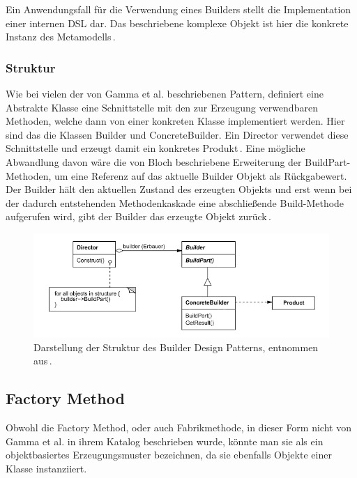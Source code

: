 \documentclass[12pt,oneside,a4paper,parskip]{scrbook}
\begin{document}
Ein Anwendungsfall für die Verwendung eines Builders stellt die Implementation einer internen DSL dar. Das beschriebene komplexe Objekt ist hier die konkrete Instanz des Metamodells\,\cite[S. 343ff.]{fowler2010}.

\subsubsection{Struktur}

Wie bei vielen der von Gamma et al. beschriebenen Pattern, definiert eine Abstrakte Klasse eine Schnittstelle mit den zur Erzeugung verwendbaren Methoden, welche dann von einer konkreten Klasse implementiert werden. Hier sind das die Klassen Builder und ConcreteBuilder. Ein Director verwendet diese Schnittstelle und erzeugt damit ein konkretes Produkt\,\cite[S. 162f.]{gamma2015}. Eine mögliche Abwandlung davon wäre die von Bloch beschriebene Erweiterung der BuildPart-Methoden, um eine Referenz auf das aktuelle Builder Objekt als Rückgabewert. Der Builder hält den aktuellen Zustand des erzeugten Objekts und erst wenn bei der dadurch entstehenden Methodenkaskade eine abschließende Build-Methode aufgerufen wird, gibt der Builder das erzeugte Objekt zurück\,\cite[S. 13ff]{bloch2017}.

\begin{figure}[htbp]
\centering
\includegraphics[width=1.0\textwidth]{bilder/builder}
\caption{Darstellung der Struktur des Builder Design Patterns, entnommen aus\,\cite[S. 162]{gamma2015}.}
\label{fig:builder}
\end{figure}

\subsection{Factory Method}

Obwohl die Factory Method, oder auch Fabrikmethode, in dieser Form nicht von Gamma et al. in ihrem Katalog beschrieben wurde, könnte man sie als ein objektbasiertes Erzeugungsmuster bezeichnen, da sie ebenfalls Objekte einer Klasse instanziiert.
\end{document}

